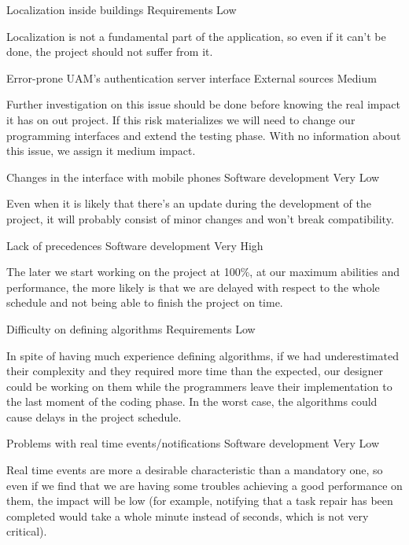 \begin{risk}[riskLocalization]{Localization inside buildings}
\riskcat Requirements
 Low

Localization is not a fundamental part of the application, so even if it can't be done, the project should not suffer from it.
\end{risk}

\begin{risk}[riskAuthServer]{Error-prone UAM's authentication server interface}
\riskcat External sources
 Medium

Further investigation on this issue should be done before knowing the real impact it has on out project. If this risk materializes we will need to change our programming interfaces and extend the testing phase. With no information about this issue, we assign it medium impact.
\end{risk}

\begin{risk}[riskPhone]{Changes in the interface with mobile phones}
\riskcat Software development
 Very Low

Even when it is likely that there's an update during the development of the project, it will probably consist of minor changes and won't break compatibility.
\end{risk}

\begin{risk}[riskPrec]{Lack of precedences}
\riskcat Software development
 Very High

The later we start working on the project at 100\%, at our maximum abilities and performance, the more likely is that we are delayed with respect to the whole schedule and not being able to finish the project on time.
\end{risk}

\begin{risk}[riskAlgorithms]{Difficulty on defining algorithms}
\riskcat Requirements
 Low

In spite of having much experience defining algorithms, if we had underestimated their complexity and they required more time than the expected, our designer could be working on them while the programmers leave their implementation to the last moment of the coding phase. In the worst case, the algorithms could cause delays in the project schedule.
\end{risk}

\begin{risk}[riskRealTime]{Problems with real time events/notifications}
\riskcat Software development
 Very Low

Real time events are more a desirable characteristic than a mandatory one, so even if we find that we are having some troubles achieving a good performance on them, the impact will be low (for example, notifying that a task repair has been completed would take a whole minute instead of seconds, which is not very critical).
\end{risk}

